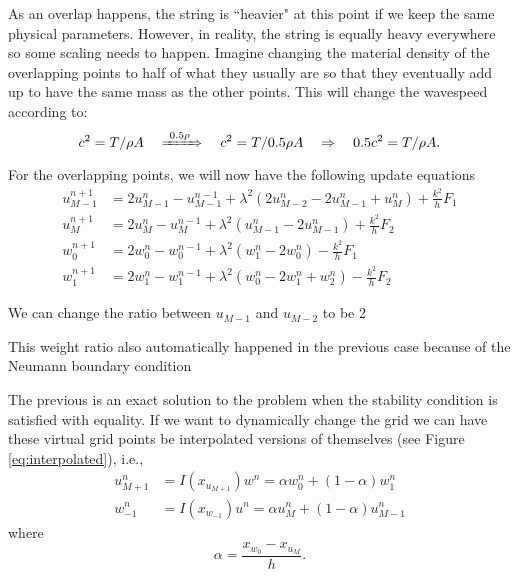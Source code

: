 \documentclass[dvipsnames]{article}
\begin{document}
As an overlap happens, the string is ``heavier" at this point if we keep the same physical parameters. However, in reality, the string is equally heavy everywhere so some scaling needs to happen. Imagine changing the material density of the overlapping points to half of what they usually are so that they eventually add up to have the same mass as the other points. This will change the wavespeed according to:
\begin{equation}
    c^2 = T/\rho A \quad \xRightarrow[]{\ 0.5\rho\ }\quad c^2 = T/0.5\rho A \quad \Rightarrow \quad 0.5c^2 = T/\rho A.
\end{equation}
For the overlapping points, we will now have the following update equations
\begin{align}
    u_{M-1}^{n+1}& = 2u_{M-1}^n - u_{M-1}^{n-1} + \lambda^2 (2u_{M-2}^n - 2u_{M-1}^n + u_{M}^n) + \frac{k^2}{h}F_1\\
    u_{M}^{n+1} &= 2u_{M}^n - u_{M}^{n-1} + \lambda^2 (u_{M-1}^n - 2u_{M-1}^n) + \frac{k^2}{h}F_2\\
    w_0^{n+1} &= 2w_0^n-w_0^{n-1} + \lambda^2 (w_1^n-2w_0^n) - \frac{k^2}{h}F_1\\
    w_1^{n+1} &= 2w_1^n-w_1^{n-1} + \lambda^2 (w_0^n-2w_1^n+w_2^n) - \frac{k^2}{h}F_2
\end{align}

We can change the ratio between $u_{M-1}$ and $u_{M-2}$ to be 2

This weight ratio also automatically happened in the previous case because of the Neumann boundary condition

The previous is an exact solution to the problem when the stability condition is satisfied with equality. If we want to dynamically change the grid we can have these virtual grid points be interpolated versions of themselves (see Figure \ref{eq:interpolated}), i.e.,
\begin{align}
    u_{M+1}^n &= I(x_{u_{M+1}})w^n = \alpha w_0^n + (1-\alpha)w_1^n\\
    w_{-1}^n &= I(x_{w_{-1}})u^n = \alpha u_M^n + (1-\alpha)u_{M-1}^n
\end{align}
where
\begin{equation}
    \alpha = \frac{x_{w_0} - x_{u_M}}{h}.
\end{equation}
\end{document}
